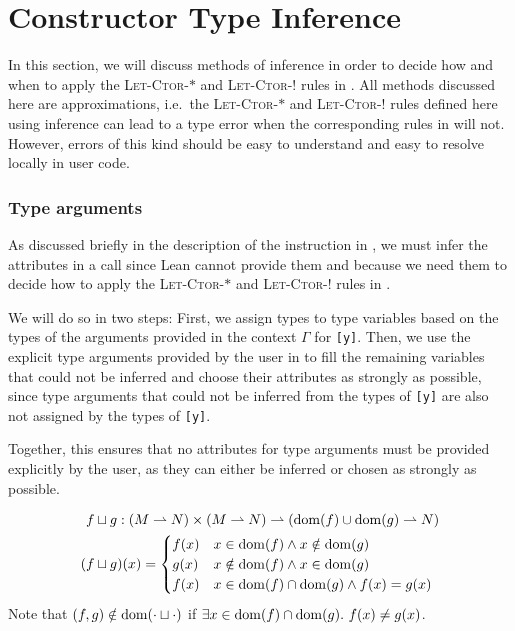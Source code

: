 \section{Constructor Type Inference}\label{sec:ctorinference}
In this section, we will discuss methods of inference in order to decide how and when to apply the \textsc{Let-Ctor-$*$} and \textsc{Let-Ctor-!} rules in . All methods discussed here are approximations, i.e.\ the \textsc{Let-Ctor-$*$} and \textsc{Let-Ctor-!} rules defined here using inference can lead to a type error when the corresponding rules in  will not. However, errors of this kind should be easy to understand and easy to resolve locally in user code.

\subsubsection{Type arguments}
As discussed briefly in the description of the  instruction in , we must infer the attributes in a  call since Lean cannot provide them and because we need them to decide how to apply the \textsc{Let-Ctor-$*$} and \textsc{Let-Ctor-!} rules in . 

We will do so in two steps: First, we assign types to type variables based on the types of the arguments provided in the context $\Gamma$ for \texttt{[y]}. Then, we use the explicit type arguments provided by the user in \icode{[τ?]} to fill the remaining variables that could not be inferred and choose their attributes as strongly as possible, since type arguments that could not be inferred from the types of \texttt{[y]} are also not assigned by the types of \texttt{[y]}. 

Together, this ensures that no attributes for type arguments must be provided explicitly by the user, as they can either be inferred or chosen as strongly as possible.

\begin{alignat*}{3}
	f &\sqcup g : (M \rightharpoonup N) \times (M \rightharpoonup N) \rightharpoonup (\mathrm{dom}(f) \cup \mathrm{dom}(g) \rightharpoonup N) \\
	(f &\sqcup g)(x) = \begin{cases}
		f(x) & x \in \mathrm{dom}(f) \land x \notin \mathrm{dom}(g) \\
		g(x) & x \notin \mathrm{dom}(f) \land x \in \mathrm{dom}(g) \\
		f(x) & x \in \mathrm{dom}(f) \cap \mathrm{dom}(g) \land f(x) = g(x)
	\end{cases}
\end{alignat*}
Note that $(f, g) \notin \mathrm{dom}(\cdot \sqcup \cdot)$ if $\exists x \in \mathrm{dom}(f) \cap \mathrm{dom}(g).\ f(x) \neq g(x)$.

